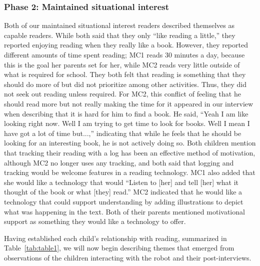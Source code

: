 \documentclass{sigchi}
\begin{document}
\subsubsection{Phase 2: Maintained situational interest}
Both of our maintained situational interest readers described themselves as capable readers. While both said that they only ``like reading a little,'' they reported enjoying reading when they really like a book. However, they reported different amounts of time spent reading; MC1 reads 30 minutes a day, because this is the goal her parents set for her, while MC2 reads very little outside of what is required for school. They both felt that reading is something that they should do more of but did not prioritize among other activities. Thus, they did not seek out reading unless required. For MC2, this conflict of feeling that he should read more but not really making the time for it appeared in our interview when describing that it is hard for him to find a book. He said, ``Yeah I am like looking right now. Well I am trying to get time to look for books. Well I mean I have got a lot of time but...,'' indicating that while he feels that he should be looking for an interesting book, he is not actively doing so. Both children mention that tracking their reading with a log has been an effective method of motivation, although MC2 no longer uses any tracking, and both said that logging and tracking would be welcome features in a reading technology. MC1 also added that she would like a technology that would ``Listen to [her] and tell [her] what it thought of the book or what [they] read.'' MC2 indicated that he would like a technology that could support understanding by adding illustrations to depict what was happening in the text. Both of their parents mentioned motivational support as something they would like a technology to offer.

Having established each child's relationship with reading, summarized in Table~\ref{tab:table1}, we will now begin describing themes that emerged from observations of the children interacting with the robot and their post-interviews.
\end{document}
